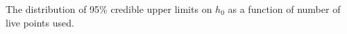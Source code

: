 \label{fig:uls}
The distribution of 95\% credible upper limits on $h_0$ as a function of number of live points
used.
